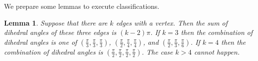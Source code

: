 \documentclass[suppldata, dvipdfmx]{interact}
\theoremstyle{plain}%
\newtheorem{theorem}{Theorem}[section]
\newtheorem{lemma}[theorem]{Lemma}
\theoremstyle{definition}
\theoremstyle{remark}
\theoremstyle{problemstyle}
\begin{document}





We prepare some lemmas to execute classifications.

\begin{lemma}\label{sum}
Suppose that there are $k$ edges with a vertex. Then the sum of
 dihedral angles of these three edges is $(k-2)\pi$.  If $k=3$ then the combination of dihedral angles is 
one of $\left( \frac{\pi}{3}, \frac{\pi}{3}, \frac{\pi}{3}\right)$, $\left( \frac{\pi}{2}, \frac{\pi}{4}, \frac{\pi}{4}\right)$, and $\left( \frac{\pi}{2}, \frac{\pi}{3}, \frac{\pi}{6}\right)$.
If $k=4$ then the combination of dihedral angles is 
$\left( \frac{\pi}{2}, \frac{\pi}{2}, \frac{\pi}{2}, \frac{\pi}{2}\right)$. The case $k>4$ cannot happen.
\end{lemma}
\end{document}
